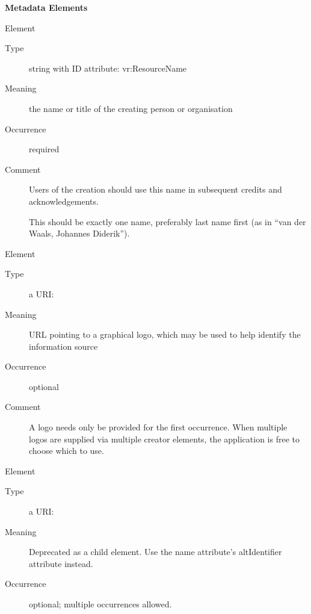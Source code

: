 \documentclass[11pt,a4paper]{ivoa}
\begin{document}
\begin{generated}
\begin{bigdescription}
\end{bigdescription}\endgroup



\vspace{0.5ex}\noindent\textbf{ Metadata Elements}

\begingroup\small\begin{bigdescription}\item[Element \xmlel{name}]
\begin{description}
\item[Type] string with ID attribute: vr:ResourceName
\item[Meaning]
                  the name or title of the creating person or organisation

\item[Occurrence] required
\item[Comment]
                  Users of the creation should use this name in
                  subsequent credits and acknowledgements.

                  This should be exactly one name, preferably last name
                  first (as in “van der Waals, Johannes Diderik”).


\end{description}
\item[Element \xmlel{logo}]
\begin{description}
\item[Type] a URI: 
\item[Meaning]
                URL pointing to a graphical logo, which may be used to help
                identify the information source

\item[Occurrence] optional
\item[Comment]
                A logo needs only be provided for the first occurrence.
                When multiple logos are supplied via multiple creator
                elements, the application is free to choose which to
                use.


\end{description}
\item[Element \xmlel{altIdentifier}]
\begin{description}
\item[Type] a URI: 
\item[Meaning]
              	Deprecated as a child element.  Use the name
              	attribute's altIdentifier attribute instead.

\item[Occurrence] optional; multiple occurrences allowed.

\end{description}


\end{bigdescription}\endgroup

\endgroup
\end{generated}
\end{document}
